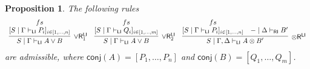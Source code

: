 \documentclass[submission,copyright,creativecommons]{eptcs}
\newtheorem{proposition}[theorem]{Proposition}
\theoremstyle{definition}
\newcommand{\tr}{\otimes \mathsf{R}}
\newcommand{\orrone}{\lor \mathsf{R}_{1}}
\newcommand{\orrtwo}{\lor \mathsf{R}_{2}}
\newcommand{\ot}{\otimes}
\newcommand{\RI}{\mathsf{RI}}
\newcommand{\LI}{\mathsf{LI}}
\newcommand{\conj}[1]{\mathsf{conj} (#1)}
\begin{document}
\begin{proposition}\label{prop:GenRightRules}
  The following rules
  \begin{displaymath}
    \begin{array}{c}
      \infer[\orrone^{\LI}]{S \mid \Gamma \vdash_{\LI} A \lor B}{
        \deduce{[S \mid \Gamma \vdash_{\LI} P_i]_{i \in [1 , \dots , n]}}{fs}
      }
      \quad
      \infer[\orrtwo^{\LI}]{S \mid \Gamma \vdash_{\LI} A \lor B}{
        \deduce{[S \mid \Gamma \vdash_{\LI} Q_i]_{i \in [1 , \dots , m]}}{fs}
      }
      \quad
      \infer[\tr^{\LI}]{S \mid \Gamma , \Delta \vdash_{\LI} A \ot B'}{
        \deduce{[S \mid \Gamma \vdash_{\LI} P_i]_{i \in [1 , \dots , n]}}{fs}
        &
        - \mid \Delta \vdash_{\RI} B'
      }
    \end{array}
  \end{displaymath}
  are admissible, where $\conj{A} = [P_1 , \dots , P_n]$ and $\conj{B} = [Q_1 , \dots , Q_m]$.
\end{proposition}
\end{document}
